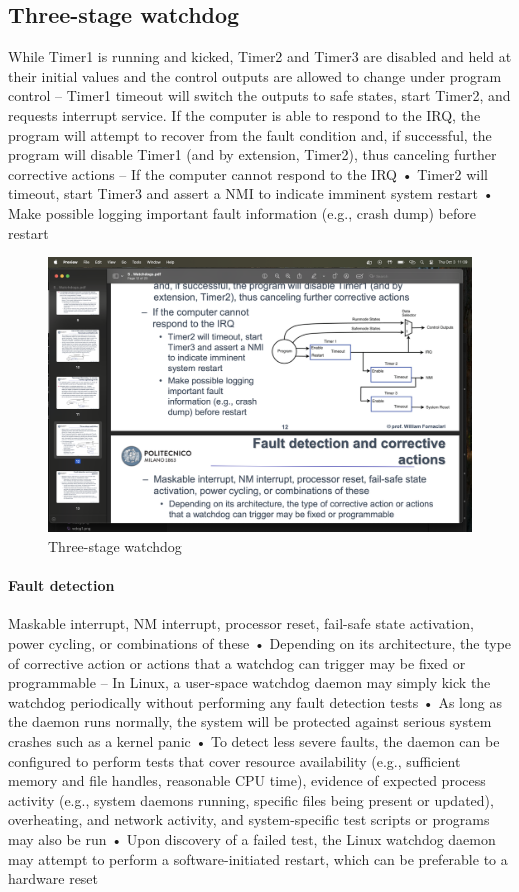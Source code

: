 \subsection{Three-stage watchdog}
While Timer1 is running and kicked, Timer2 and Timer3 are
disabled and held at their initial values and the control outputs are
allowed to change under program control
– Timer1 timeout will switch the outputs to safe states, start Timer2,
and requests interrupt service. If the computer is able to respond to
the IRQ, the program will attempt to recover from the fault condition
and, if successful, the program will disable Timer1 (and by
extension, Timer2), thus canceling further corrective actions
– If the computer cannot
respond to the IRQ
• Timer2 will timeout, start
Timer3 and assert a NMI
to indicate imminent
system restart
• Make possible logging
important fault
information (e.g., crash
dump) before restart
\begin{figure}[H]
    \centering
    \includegraphics[width=0.75\linewidth]{images/wdog3.png}
    \caption{Three-stage watchdog}
\end{figure}

\paragraph*{Fault detection}
Maskable interrupt, NM interrupt, processor reset, fail-safe state
activation, power cycling, or combinations of these
• Depending on its architecture, the type of corrective action or actions
that a watchdog can trigger may be fixed or programmable
– In Linux, a user-space watchdog daemon may simply kick the
watchdog periodically without performing any fault detection tests
• As long as the daemon runs normally, the system will be protected
against serious system crashes such as a kernel panic
• To detect less severe faults, the daemon can be configured to perform
tests that cover resource availability (e.g., sufficient memory and file
handles, reasonable CPU time), evidence of expected process activity
(e.g., system daemons running, specific files being present or updated),
overheating, and network activity, and system-specific test scripts or
programs may also be run
• Upon discovery of a failed test, the Linux watchdog daemon may
attempt to perform a software-initiated restart, which can be preferable
to a hardware reset

